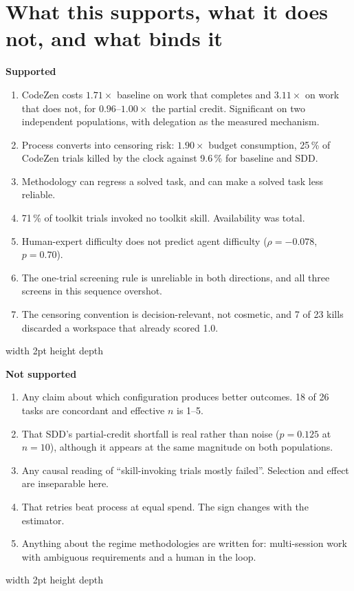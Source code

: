 \documentclass[11pt,a4paper]{article}
\newenvironment{finding}[1]
  {\par\medskip\noindent\begin{lrbox}{\findingbox}%
   \begin{minipage}{\dimexpr\linewidth-2\fboxsep-4pt}%
   \vspace{3pt}\textbf{\color{accent}#1}\par\smallskip\small}
  {\vspace{4pt}\end{minipage}\end{lrbox}%
   \noindent\textcolor{accent}{\vrule width 2pt height \dimexpr\ht\findingbox\relax depth \dimexpr\dp\findingbox\relax}%
   \colorbox{shade}{\usebox{\findingbox}}\par\medskip}
\begin{document}
\section{What this supports, what it does not, and what binds it}
\label{sec:limits}

\begin{finding}{Supported}
\begin{enumerate}[nosep]
\item CodeZen costs $1.71\times$ baseline on work that completes and $3.11\times$ on work that
      does not, for $0.96$--$1.00\times$ the partial credit. Significant on two independent
      populations, with delegation as the measured mechanism.
\item Process converts into censoring risk: $1.90\times$ budget consumption, 25\,\% of CodeZen
      trials killed by the clock against 9.6\,\% for baseline and SDD.
\item Methodology can regress a solved task, and can make a solved task less reliable.
\item 71\,\% of toolkit trials invoked no toolkit skill. Availability was total.
\item Human-expert difficulty does not predict agent difficulty ($\rho = -0.078$, $p = 0.70$).
\item The one-trial screening rule is unreliable in both directions, and all three screens in
      this sequence overshot.
\item The censoring convention is decision-relevant, not cosmetic, and 7 of 23 kills discarded
      a workspace that already scored 1.0.
\end{enumerate}
\end{finding}

\begin{finding}{Not supported}
\begin{enumerate}[nosep]
\item Any claim about which configuration produces better outcomes. 18 of 26 tasks are
      concordant and effective $n$ is 1--5.
\item That SDD's partial-credit shortfall is real rather than noise ($p = 0.125$ at $n = 10$),
      although it appears at the same magnitude on both populations.
\item Any causal reading of ``skill-invoking trials mostly failed''. Selection and effect are
      inseparable here.
\item That retries beat process at equal spend. The sign changes with the estimator.
\item Anything about the regime methodologies are written for: multi-session work with
      ambiguous requirements and a human in the loop.
\end{enumerate}
\end{finding}
\end{document}
